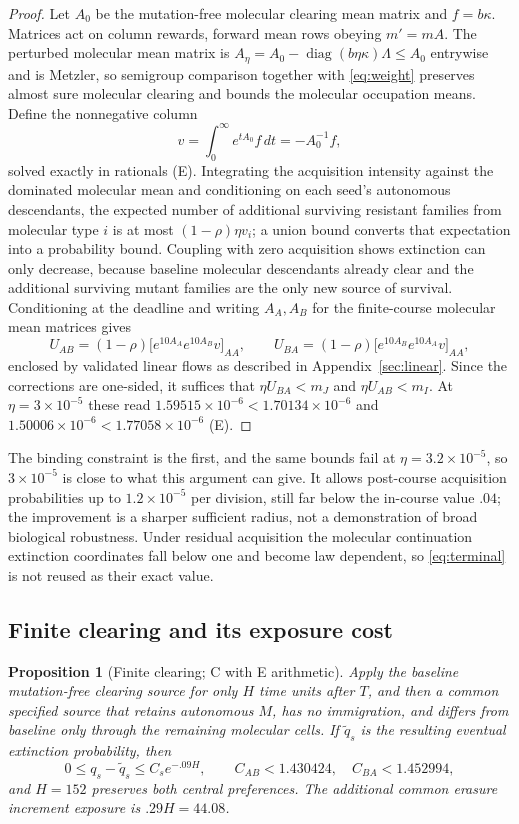 \documentclass[11pt]{article}
\newtheorem{proposition}[theorem]{Proposition}
\theoremstyle{remark}
\newcommand{\diag}{\operatorname{diag}}
\begin{document}
\begin{proof}
Let $A_0$ be the mutation-free molecular clearing mean matrix and $f=b\kappa$.
Matrices act on column rewards, forward mean rows obeying $m'=mA$. The perturbed
molecular mean matrix is $A_\eta=A_0-\diag(b\eta\kappa)\Lambda\le A_0$ entrywise
and is Metzler, so semigroup comparison together with \eqref{eq:weight} preserves
almost sure molecular clearing and bounds the molecular occupation means. Define
the nonnegative column
\[
 v=\int_0^\infty e^{tA_0}f\,dt=-A_0^{-1}f,
\]
solved exactly in rationals \textup{(E)}. Integrating the acquisition intensity
against the dominated molecular mean and conditioning on each seed's autonomous
descendants, the expected number of additional surviving resistant families from
molecular type $i$ is at most $(1-\rho)\eta v_i$; a union bound converts that
expectation into a probability bound. Coupling with zero acquisition shows
extinction can only decrease, because baseline molecular descendants already
clear and the additional surviving mutant families are the only new source of
survival. Conditioning at the deadline and writing $A_A,A_B$ for the
finite-course molecular mean matrices gives
\[
 U_{AB}=(1-\rho)\bigl[e^{10A_A}e^{10A_B}v\bigr]_{AA},\qquad
 U_{BA}=(1-\rho)\bigl[e^{10A_B}e^{10A_A}v\bigr]_{AA},
\]
enclosed by validated linear flows as described in
Appendix~\ref{sec:linear}. Since the corrections are one-sided, it suffices that
$\eta U_{BA}<m_J$ and $\eta U_{AB}<m_I$. At $\eta=3\times10^{-5}$ these read
$1.59515\times10^{-6}<1.70134\times10^{-6}$ and
$1.50006\times10^{-6}<1.77058\times10^{-6}$ \textup{(E)}.
\end{proof}

The binding constraint is the first, and the same bounds fail at
$\eta=3.2\times10^{-5}$, so $3\times10^{-5}$ is close to what this argument can
give. It allows post-course acquisition probabilities up to $1.2\times10^{-5}$
per division, still far below the in-course value $.04$; the improvement is a
sharper sufficient radius, not a demonstration of broad biological robustness.
Under residual acquisition the molecular continuation extinction coordinates fall
below one and become law dependent, so \eqref{eq:terminal} is not reused as their
exact value.

\subsection{Finite clearing and its exposure cost}
\begin{proposition}[Finite clearing; C with E arithmetic]\label{prop:clearing}
Apply the baseline mutation-free clearing source for only $H$ time units after
$T$, and then a common specified source that retains autonomous $M$, has no
immigration, and differs from baseline only through the remaining molecular
cells. If $\widetilde q_s$ is the resulting eventual extinction probability, then
\[
 0\le q_s-\widetilde q_s\le C_se^{-.09H},\qquad
 C_{AB}<1.430424,\quad C_{BA}<1.452994,
\]
and $H=152$ preserves both central preferences. The additional common erasure
increment exposure is $.29H=44.08$.
\end{proposition}
\end{document}
